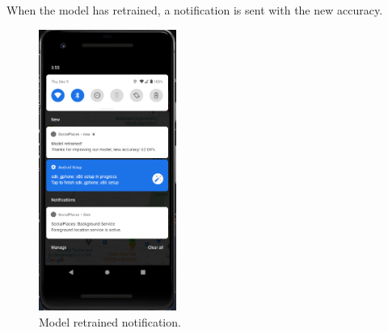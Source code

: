 \documentclass[../../main]{subfiles}
\begin{document}
When the model has retrained, a notification is sent with the new accuracy.
\begin{figure}[H]
    \centering
    \includegraphics[width=0.4\textwidth]{images/app/notification/recommendation/new_accuracy}
    \caption{Model retrained notification.}
\end{figure}
\end{document}

